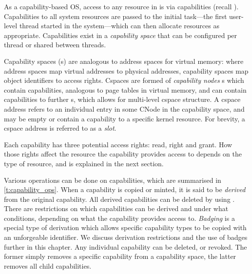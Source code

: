 As a capability-based \gls{OS}, access to any resource in \selfour is via capabilities (recall
). Capabilities to all system resources are passed to the initial task---the first
user-level thread started in the system---which can then allocate resources as appropriate.
Capabilities exist in a \emph{capability space} that can be configured per thread or shared between
threads. 

Capability spaces (s) are analogous to address spaces for virtual memory: where address spaces map
virtual addresses to physical addresses, capability spaces map object identifiers to access rights.
Cspaces are formed of \emph{capability nodes} s which contain capabilities, analogous to page tables
in virtual memory, and can contain capabilities to further s, which allows for multi-level
cspace structure. A cspace address refers
to an individual entry in some CNode in the capability space, and may be empty or contain a
capability to a specific kernel resource. For brevity, a cspace address is referred to as
a \emph{slot}. 

Each capability has three potential access rights: read, right and grant. How those rights affect
the resource the capability provides access to depends on the type of resource, and is explained in
the next section.

Various operations can be done on capabilities, which are summarised in \cref{t:capability_ops}.
When a capability is copied or minted, it is said to be \emph{derived} from the original capability.
All derived capabilities can be deleted by using .
There are restrictions on which capabilities can be derived and under what conditions, depending on
what the capability provides access to. 
\emph{Badging} is a special type of derivation which allows specific capability types to be copied
with an unforgeable identifier. We discuss derivation restrictions and the use of badges further
in this chapter.
Any individual capability can be deleted, or revoked. The former simply removes a specific
capability from a capability space, the latter removes all child capabilities.

